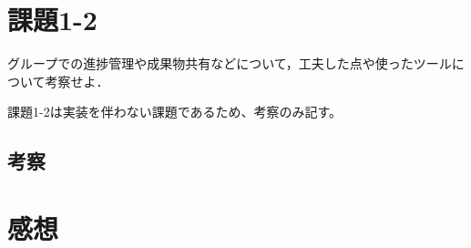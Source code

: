 \documentclass[a4j]{jarticle}
\begin{document}
\section{課題1-2}
\begin{screen}
  グループでの進捗管理や成果物共有などについて，工夫した点や使ったツールについて考察せよ．
\end{screen}
課題1-2は実装を伴わない課題であるため、考察のみ記す。
\subsection{考察}

\section{感想}
\end{document}
